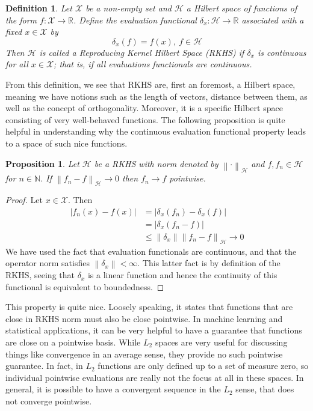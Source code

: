\documentclass[12pt]{article}
\newcommand*{\norm}[1]{\left\lVert#1\right\rVert}
\newcommand*{\abs}[1]{\left\lvert#1\right\rvert}
\newcommand{\R}{\mathbb{R}}
\newtheorem{definition}{Definition}
\newtheorem{prop}{Proposition}
\begin{document}
\begin{definition} 
Let $\mathcal{X}$ be a non-empty set and $\mathcal{H}$ a Hilbert space of functions of the form $f: \mathcal{X} \to \R$. Define the \textit{evaluation functional} $\delta_x: \mathcal{H} \to \R$ associated with a fixed $x \in \mathcal{X}$ by 
\[\delta_x(f) = f(x), \ f \in \mathcal{H}\]
Then $\mathcal{H}$ is called a Reproducing Kernel Hilbert Space (RKHS) if $\delta_x$ is continuous for all $x \in \mathcal{X}$; that is, if all evaluations functionals are continuous. 
\end{definition}
From this definition, we see that RKHS are, first an foremost, a Hilbert space, meaning we have notions such as the length of vectors, distance between them, as well as the concept of orthogonality. Moreover, it is a specific Hilbert space consisting of very well-behaved functions. The following proposition is quite helpful in understanding why the continuous evaluation functional property leads to a space of such nice functions. 
\begin{prop}
Let $\mathcal{H}$ be a RKHS with norm denoted by $\norm{\cdot}_{\mathcal{H}}$ and $f, f_n \in \mathcal{H}$ for $n \in \mathbb{N}$. If $\norm{f_n - f}_{\mathcal{H}} \to 0$ then $f_n \to f$ pointwise. 
\end{prop}
\begin{proof} 
Let $x \in \mathcal{X}$. Then 
\begin{align*}
\abs{f_n(x) - f(x)} &= \abs{\delta_x(f_n) - \delta_x(f)} \\
			   &= \abs{\delta_x(f_n - f)} \\
			   &\leq \norm{\delta_x}\norm{f_n - f}_{\mathcal{H}} \to 0
\end{align*}
We have used the fact that evaluation functionals are continuous, and that the operator norm satisfies $\norm{\delta_x} < \infty$. This latter fact is by definition of the RKHS, seeing that $\delta_x$ is a linear function and hence the continuity 
of this functional is equivalent to boundedness. 
\end{proof}
This property is quite nice. Loosely speaking, it states that functions that are close in RKHS norm must also be close pointwise. In machine learning and statistical applications, it can be very helpful to have a guarantee that functions are close 
on a pointwise basis. While $L_2$ spaces are very useful for discussing things like convergence in an average sense, they provide no such pointwise guarantee. In fact, in $L_2$ functions are only defined up to a set of measure zero, so individual pointwise evaluations are really not the focus at all in these spaces. In general, it is possible to have a convergent sequence in the $L_2$ sense, that does not converge pointwise. 
\end{document}

